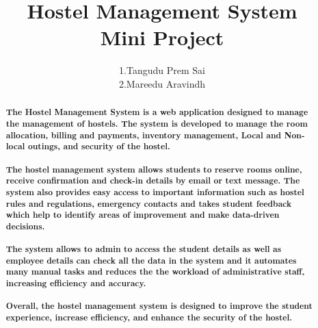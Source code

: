 \documentclass{article}
\begin{document}
\title{\huge\textbf{Hostel Management System\\Mini Project}}
\author{1.Tangudu Prem Sai\\2.Mareedu Aravindh}
\renewcommand{\abstractname}{\huge\textbf{Abstract\\...............}}
\maketitle

\begin{abstract}



    \textbf{The Hostel Management System is a web application designed to manage the management of hostels. The system is developed to manage the room allocation, billing and payments, inventory management, Local and Non-local outings, and security of the hostel.}\\ \\
    
\textbf{The hostel  management system allows students to reserve rooms online, receive confirmation and check-in details by email or text message. The system also provides easy access to important information such as hostel rules and regulations, emergency contacts and takes student feedback which help to identify areas of improvement and make data-driven decisions.}\\ \\

\textbf{The system allows to admin to access the student details as well as employee details can check all the data in the system and it automates many manual tasks and reduces the the workload of administrative staff, increasing efficiency and accuracy.}\\ \\


\textbf{Overall, the hostel management system is designed to improve the student experience, increase efficiency, and enhance the security of the hostel.}


\end{abstract}
\end{document}
